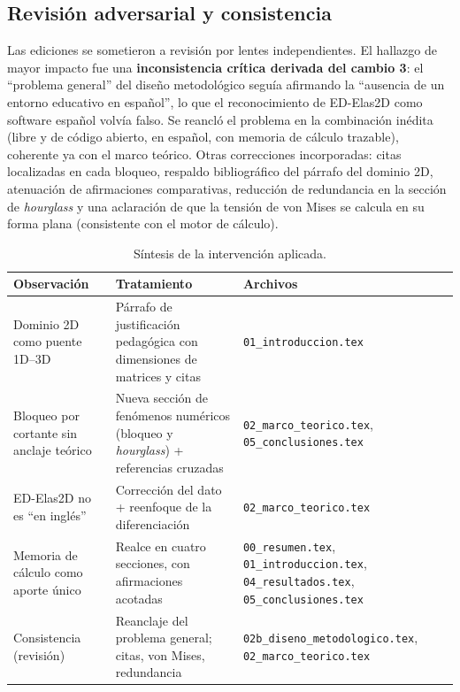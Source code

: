 \documentclass[11pt,a4paper]{article}
\newcommand{\fileref}[1]{\texttt{\small #1}}
\begin{document}
\subsection*{Revisión adversarial y consistencia}

Las ediciones se sometieron a revisión por lentes independientes. El hallazgo de mayor impacto
fue una \textbf{inconsistencia crítica derivada del cambio 3}: el ``problema general'' del
diseño metodológico seguía afirmando la ``ausencia de un entorno educativo en español'', lo que
el reconocimiento de ED-Elas2D como software español volvía falso. Se reancló el problema en la
combinación inédita (libre y de código abierto, en español, con memoria de cálculo trazable),
coherente ya con el marco teórico. Otras correcciones incorporadas: citas localizadas en cada
bloqueo, respaldo bibliográfico del párrafo del dominio 2D, atenuación de afirmaciones
comparativas, reducción de redundancia en la sección de \emph{hourglass} y una aclaración de que
la tensión de von Mises se calcula en su forma plana (consistente con el motor de cálculo).

\begin{table}[h]
\centering
\caption{Síntesis de la intervención aplicada.}
\label{tab:intervencion}
\small
\renewcommand{\arraystretch}{1.25}
\begin{tabular}{@{}p{4.0cm}p{6.2cm}p{4.6cm}@{}}
\toprule
\textbf{Observación} & \textbf{Tratamiento} & \textbf{Archivos} \\
\midrule
Dominio 2D como puente 1D--3D & Párrafo de justificación pedagógica con dimensiones de matrices y citas & \fileref{01\_introduccion.tex} \\
Bloqueo por cortante sin anclaje teórico & Nueva sección de fenómenos numéricos (bloqueo y \emph{hourglass}) + referencias cruzadas & \fileref{02\_marco\_teorico.tex}, \fileref{05\_conclusiones.tex} \\
ED-Elas2D no es ``en inglés'' & Corrección del dato + reenfoque de la diferenciación & \fileref{02\_marco\_teorico.tex} \\
Memoria de cálculo como aporte único & Realce en cuatro secciones, con afirmaciones acotadas & \fileref{00\_resumen.tex}, \fileref{01\_introduccion.tex}, \fileref{04\_resultados.tex}, \fileref{05\_conclusiones.tex} \\
Consistencia (revisión) & Reanclaje del problema general; citas, von Mises, redundancia & \fileref{02b\_diseno\_metodologico.tex}, \fileref{02\_marco\_teorico.tex} \\
\bottomrule
\end{tabular}
\end{table}
\end{document}
